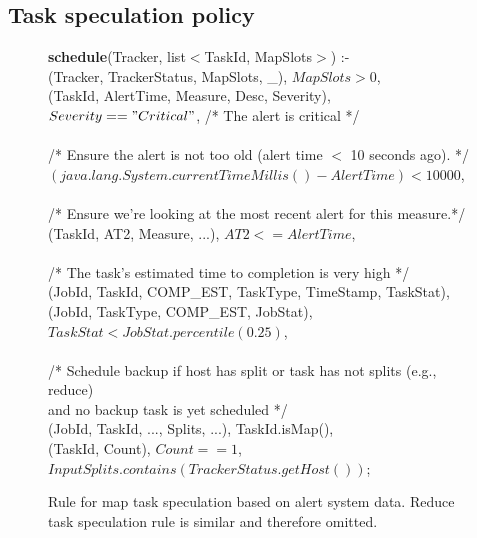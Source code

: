 \subsection{Task speculation policy} 
\label{ch:hop:sec:speculation}

\begin{figure}
\ssp
\centering
\begin{boxedminipage}{\linewidth}

{\bf schedule}(Tracker, list$<$TaskId, MapSlots$>$) :- \\
(Tracker, TrackerStatus, MapSlots, \_),  $MapSlots > 0$, \\
(TaskId, AlertTime, Measure, Desc, Severity), \\
\datalogspace $Severity == "Critical"$,  /* The alert is critical */ \\
\\
\datalogspace /* Ensure the alert is not too old (alert time $<$ 10 seconds ago). */ \\
\datalogspace $(java.lang.System.currentTimeMillis() - AlertTime) < 10000$,  \\
\\
\datalogspace /* Ensure we're looking at the most recent alert for this measure.*/ \\
(TaskId, AT2, Measure, ...), $AT2 <= AlertTime$, \\
\\
\datalogspace  /* The task's estimated time to completion is very high */ \\
(JobId, TaskId, COMP\_EST, TaskType, TimeStamp, TaskStat), \\
(JobId, TaskType, COMP\_EST, JobStat),  \\
\datalogspace $TaskStat < JobStat.percentile(0.25)$,  \\
\\
\datalogspace /* Schedule backup if host has split or task has not splits (e.g., reduce) \\
\datalogspace  \xspace and no backup task is yet scheduled */ \\
(JobId, TaskId, ..., Splits, ...), TaskId.isMap(), \\
(TaskId, Count), $Count == 1$, \\
\datalogspace $InputSplits.contains(TrackerStatus.getHost())$; \\
\end{boxedminipage}
\caption{\label{ch:hop:fig:speculation} Rule for map task speculation based on alert system data. Reduce task 
speculation rule is similar and therefore omitted. }
\end{figure}    
   
